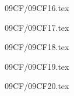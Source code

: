 \documentclass[9pt, xcolor={svgnames, x11names},professionalfonts]{beamer}
\begin{document}

\begin{frame}{09CF/09CF16.tex}
	
\end{frame}


\begin{frame}{09CF/09CF17.tex}
	
\end{frame}


\begin{frame}{09CF/09CF18.tex}
	
\end{frame}


\begin{frame}{09CF/09CF19.tex}
	
\end{frame}


\begin{frame}{09CF/09CF20.tex}
	
\end{frame}













\end{document}

